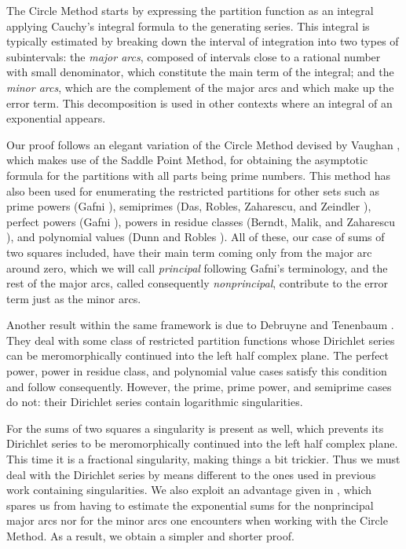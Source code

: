 \documentclass[12pt,reqno]{amsart}
\begin{document}
The Circle Method starts by expressing the partition function as an integral applying Cauchy's integral formula to the generating series. This integral is typically estimated by breaking down the interval of integration into two types of subintervals: the \textit{major arcs}, composed of intervals close to a rational number with small denominator, which constitute the main term of the integral; and the \textit{minor arcs}, which are the complement of the major arcs and which make up the error term. This decomposition is used in other contexts where an integral of an exponential appears.


 
Our proof follows an elegant variation of the Circle Method devised by Vaughan \cite{vaughan}, which makes use of the Saddle Point Method, for obtaining the asymptotic formula for the partitions with all parts being prime numbers. This method has also been used for enumerating the restricted partitions for other sets such as  prime powers (Gafni \cite{gafni2}), semiprimes (Das, Robles, Zaharescu, and Zeindler \cite{robles}), perfect powers (Gafni \cite{gafni1}), powers in residue classes (Berndt, Malik, and Zaharescu \cite{malik}), and polynomial values (Dunn and Robles \cite{dunn}).  All of these, our case of sums of two squares included, have their main term coming only from the major arc around zero, which we will call \textit{principal} following Gafni's \cite{gafni2} terminology, and the rest of the major arcs, called consequently \textit{nonprincipal}, contribute to the error term just as the minor arcs. 

Another result within the same framework is due to Debruyne and Tenenbaum \cite{dt}. They deal with some class of restricted partition functions whose Dirichlet series can be meromorphically continued into the left half complex plane.
The perfect power, power in residue class, and polynomial value cases satisfy this condition and follow consequently. However, the prime, prime power, and semiprime cases do not: their Dirichlet series contain logarithmic singularities. 

For the sums of two squares a singularity is present as well, which prevents its Dirichlet series to be meromorphically continued into the left half complex plane. This time it is a fractional singularity, making things a bit trickier. Thus we must deal with the Dirichlet series by means different to 
the ones used in previous work containing singularities. We also exploit an advantage given in \cite{dt}, which spares us from having to estimate the exponential sums for the nonprincipal major arcs nor for the minor arcs one encounters when working with the Circle Method. As a result, we obtain a simpler and shorter proof.
\end{document}
